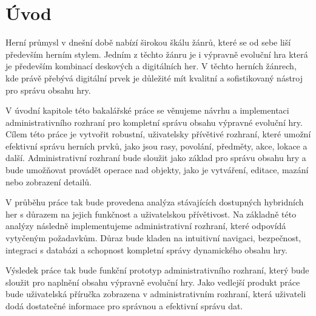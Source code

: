 \chapter{Úvod}
\label{ch:introduction}

Herní průmysl v dnešní době nabízí širokou škálu žánrů, které se od sebe liší především herním stylem. Jedním z těchto žánru je i výpravně evoluční hra která je především kombinací deskových a digitálních her. V těchto herních žánrech, kde právě přebývá digitální prvek je důležité mít kvalitní a sofistikovaný nástroj pro správu obsahu hry.

V úvodní kapitole této bakalářské práce se věnujeme návrhu a implementaci administrativního rozhraní pro kompletní správu obsahu výpravné evoluční hry. Cílem této práce je vytvořit robustní, uživatelsky přívětivé rozhraní, které umožní efektivní správu herních prvků, jako jsou rasy, povolání, předměty, akce, lokace a další. Administrativní rozhraní bude sloužit jako základ pro správu obsahu hry a bude umožňovat provádět operace nad objekty, jako je vytváření, editace, mazání nebo zobrazení detailů.

V průběhu práce tak bude provedena analýza stávajících dostupných hybridních her s důrazem na jejich funkčnost a uživatelskou přívětivost. Na základně této analýzy následně implementujeme administrativní rozhraní, které odpovídá vytyčeným požadavkům. Důraz bude kladen na intuitivní navigaci, bezpečnost, integraci s databázi a schopnost kompletní správy dynamického obsahu hry.

Výsledek práce tak bude funkční prototyp administrativního rozhraní, který bude sloužit pro naplnění obsahu výpravně evoluční hry. Jako vedlejší produkt práce bude uživatelská příručka zobrazena v administrativním rozhraní, která uživateli dodá dostatečné informace pro správnou a efektivní správu dat.

\endinput
